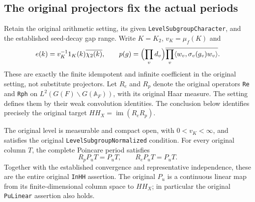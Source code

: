 \subsection{The original projectors fix the actual periods}
\label{global-gram-original-projectors}

Retain the original arithmetic setting, its given
\texttt{LevelSubgroupCharacter}, and the established seed-decay
gap range.  Write $K=K_2$, $v_K=\mu_f(K)$ and
\[
 e(k)=v_K^{-1}1_K(k)\overline{\chi_2(k)},\qquad
 p(g)=\Bigl(\prod_vd_v\Bigr)
             \overline{\prod_v\langle w_v,\sigma_v(g_v)w_v\rangle}.
\]
These are exactly the finite idempotent and infinite coefficient
in the original setting, not substitute projectors.
Let $R_e$ and $R_p$ denote the original operators
\texttt{Re} and \texttt{Rph} on
$L^2(G(F)\backslash G(\mathbb A_F))$, with its original Haar measure.
The setting defines them by their weak convolution identities.
The conclusion below identifies precisely the original target
$HH_X=\operatorname{im}(R_eR_p)$.
\cite{global-gram-projector-source}

\begin{theorem}
\label{global-gram-inhh-theorem}
The original level is measurable and compact open, with
$0<v_K<\infty$, and satisfies the original
\texttt{LevelSubgroupNormalized} condition.  For every original
column $T$, the complete Poincare period satisfies
\begin{equation}\label{global-gram-projectors-fix}
              R_pP_uT=P_uT,
              \qquad R_eP_uT=P_uT.
\end{equation}
Together with the established convergence and representative
independence, these are the entire original \texttt{InHH}
assertion.  The original $P_u$ is a continuous linear map from
its finite-dimensional column space to $HH_X$; in particular
the original \texttt{PuLinear} assertion also holds.
\end{theorem}

